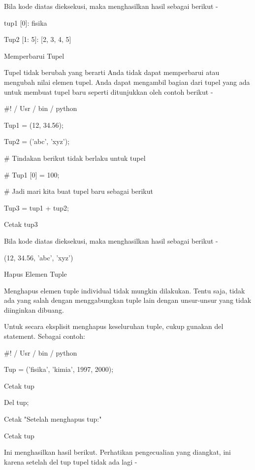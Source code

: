 Bila kode diatas dieksekusi, maka menghasilkan hasil sebagai berikut - \par
tup1 [0]: fisika \par
Tup2 [1: 5]: [2, 3, 4, 5] \par
Memperbarui Tupel \par
Tupel tidak berubah yang berarti Anda tidak dapat memperbarui atau mengubah nilai elemen tupel. Anda dapat mengambil bagian dari tupel yang ada untuk membuat tupel baru seperti ditunjukkan oleh contoh berikut - \par
 $  \#  $! / Usr / bin / python \par
\vspace{12pt}
Tup1 = (12, 34.56); \par
Tup2 = ('abc', 'xyz'); \par
\vspace{12pt}
 $  \#  $ Tindakan berikut tidak berlaku untuk tupel \par
 $  \#  $ Tup1 [0] = 100; \par
\vspace{12pt}
 $  \#  $ Jadi mari kita buat tupel baru sebagai berikut \par
Tup3 = tup1 + tup2; \par
Cetak tup3 \par
Bila kode diatas dieksekusi, maka menghasilkan hasil sebagai berikut - \par
(12, 34.56, 'abc', 'xyz') \par
Hapus Elemen Tuple \par
Menghapus elemen tuple individual tidak mungkin dilakukan. Tentu saja, tidak ada yang salah dengan menggabungkan tuple lain dengan unsur-unsur yang tidak diinginkan dibuang. \par
Untuk secara eksplisit menghapus keseluruhan tuple, cukup gunakan del statement. Sebagai contoh: \par
 $  \#  $! / Usr / bin / python \par
\vspace{12pt}
Tup = ('fisika', 'kimia', 1997, 2000); \par
\vspace{12pt}
Cetak tup \par
Del tup; \par
Cetak "Setelah menghapus tup:" \par
Cetak tup \par
Ini menghasilkan hasil berikut. Perhatikan pengecualian yang diangkat, ini karena setelah del tup tupel tidak ada lagi - \par

